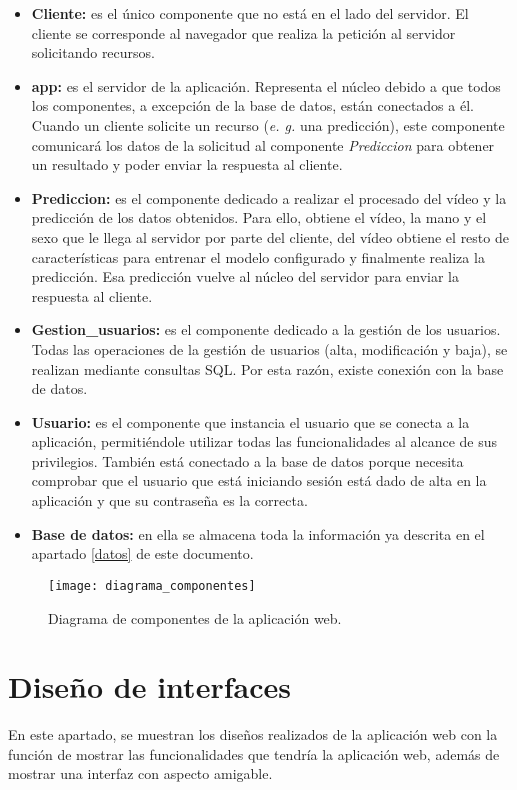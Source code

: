 \begin{itemize}
	\item \textbf{Cliente:} es el único componente que no está en el lado del servidor. El cliente se corresponde al navegador que realiza la petición al servidor solicitando recursos.
	\item \textbf{app:} es el servidor de la aplicación. Representa el núcleo debido a que todos los componentes, a excepción de la base de datos, están conectados a él. Cuando un cliente solicite un recurso (\textit{e. g.} una predicción), este componente comunicará los datos de la solicitud al componente \textit{Prediccion} para obtener un resultado y poder enviar la respuesta al cliente.
	\item \textbf{Prediccion:} es el componente dedicado a realizar el procesado del vídeo y la predicción de los datos obtenidos. Para ello, obtiene el vídeo, la mano y el sexo que le llega al servidor por parte del cliente, del vídeo obtiene el resto de características para entrenar el modelo configurado y finalmente realiza la predicción. Esa predicción vuelve al núcleo del servidor para enviar la respuesta al cliente.
	\item \textbf{Gestion\_usuarios:} es el componente dedicado a la gestión de los usuarios. Todas las operaciones de la gestión de usuarios (alta, modificación y baja), se realizan mediante consultas SQL. Por esta razón, existe conexión con la base de datos.
	\item \textbf{Usuario:} es el componente que instancia el usuario que se conecta a la aplicación, permitiéndole utilizar todas las funcionalidades al alcance de sus privilegios. También está conectado a la base de datos porque necesita comprobar que el usuario que está iniciando sesión está dado de alta en la aplicación y que su contraseña es la correcta.
	\item \textbf{Base de datos:} en ella se almacena toda la información ya descrita en el apartado \ref{datos} de este documento.
\end{itemize}

\begin{figure}[ht]
	\texttt{[image: diagrama\_componentes]}
	\caption{Diagrama de componentes de la aplicación web.}
	\label{fig:diagrama_componentes}
\end{figure} 

\section{Diseño de interfaces}
En este apartado, se muestran los diseños realizados de la aplicación web con la función de mostrar las funcionalidades que tendría la aplicación web, además de mostrar una interfaz con aspecto amigable.

